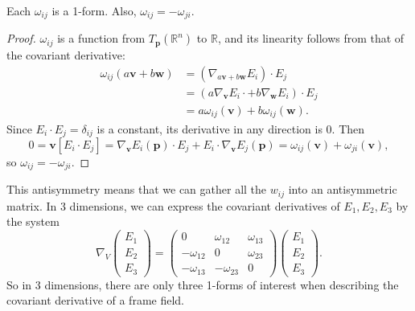 \documentclass[10pt]{report}
\begin{document}
\begin{lem}
	Each $\omega_{ij}$ is a 1-form. Also, $\omega_{ij}=-\omega_{ji}$.
\end{lem}
\begin{proof}
	$\omega_{ij}$ is a function from $T_{\mathbf{p}}(\mathbb{R}^n)$ to $\mathbb{R}$, and its linearity follows from that of the covariant derivative:
	\begin{align*}
		\omega_{ij}(a\mathbf{v} + b\mathbf{w}) &= (\nabla_{a\mathbf{v} + b\mathbf{w}}E_i) \cdot E_j \\
						       &= (a \nabla_{\mathbf{v}}E_i\cdot + b\nabla_{\mathbf{w}}E_i)\cdot E_j \\
						       &= a\omega_{ij}(\mathbf{v})+b\omega_{ij}(\mathbf{w}).
	\end{align*}
	Since $E_i \cdot E_j = \delta_{ij}$ is a constant, its derivative in any direction is 0. Then
	\[
		0 = \mathbf{v}[E_i \cdot E_j] = \nabla_{\mathbf{v}}E_i(\mathbf{p})\cdot E_j + E_i \cdot \nabla_{\mathbf{v}}E_j(\mathbf{p}) = \omega_{ij}(\mathbf{v}) + \omega_{ji}(\mathbf{v}),
	\]
	so $\omega_{ij}=-\omega_{ji}$.
\end{proof}

This antisymmetry means that we can gather all the $w_{ij}$ into an antisymmetric matrix. In 3 dimensions, we can express the covariant derivatives of $E_1,E_2,E_3$ by the system
\[
	\nabla_{V}
	\begin{pmatrix}
		E_1\\E_2\\E_3
	\end{pmatrix}=
\begin{pmatrix}
	0 & \omega_{12}& \omega_{13} \\
	-\omega_{12}&0&\omega_{23}\\
	-\omega_{13}&-\omega_{23}&0
\end{pmatrix}
\begin{pmatrix}
	E_1\\E_2\\E_3
\end{pmatrix}.
\] 
So in 3 dimensions, there are only three 1-forms of interest when describing the covariant derivative of a frame field.
\end{document}
